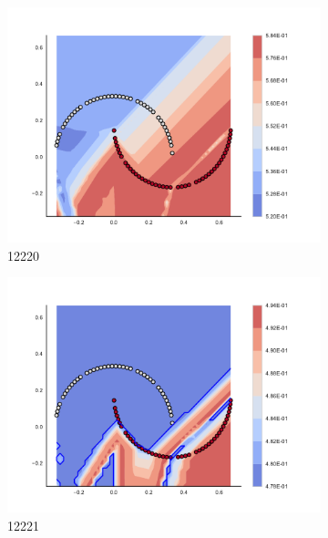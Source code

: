 \begin{figure}[h]
\begin{subfigure}[b]{0.09\textwidth}
    \includegraphics[clip, trim=2.35cm 1.75cm 4.5cm 0cm,width=\textwidth]{img/convergence/12220.pdf}
    \caption{12220}
    \label{fig:convergence_12220}
\end{subfigure}
%
\begin{subfigure}[b]{0.09\textwidth}
    \includegraphics[clip, trim=2.35cm 1.75cm 4.5cm 0cm,width=\textwidth]{img/convergence/12221.pdf}
    \caption{12221}
    \label{fig:convergence_12221}
\end{subfigure}
%
\begin{subfigure}[b]{0.09\textwidth}

\end{subfigure}
\end{figure}
